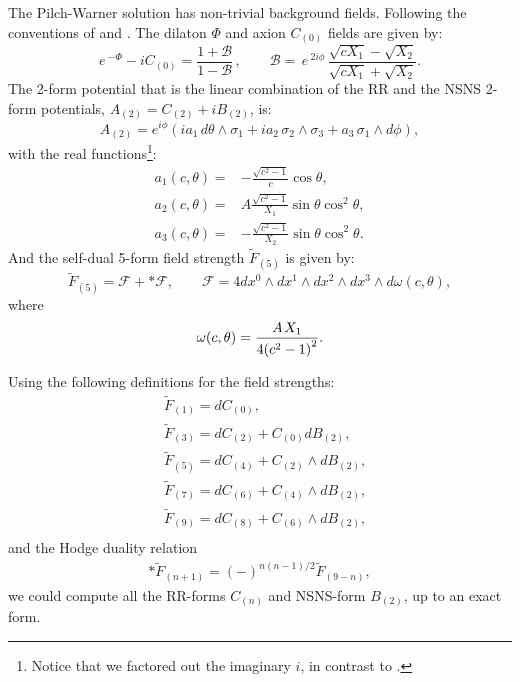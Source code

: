 The Pilch-Warner solution has non-trivial background fields. Following the conventions of \cite{Buchel:2000cn} and \cite{Pilch:2003jg}. The dilaton $\Phi$ and axion $C_{(0)}$ fields are given by:
\begin{equation}
 e\,^{-\Phi }-i C_{(0)} =\frac{1+\mathcal{B}}{1-\mathcal{B}}\,,
 \qquad
 \mathcal{B}=\,e\,^{2i\phi }\,\frac{\sqrt{cX_1}-\sqrt{X_2}}{\sqrt{cX_1}+\sqrt{X_2}}.
\end{equation}
The 2-form potential that is the linear combination of the RR and the NSNS 2-form potentials, $A_{(2)}=C_{(2)}+i B_{(2)}$, is:
\begin{equation}
 A_{(2)} = e^{i \phi}\left(i a_1 \, d\theta \wedge \sigma_1 + i a_2 \, \sigma_2 \wedge \sigma_3 + a_3\, \sigma_1 \wedge d\phi\right),
\end{equation}
with the real functions\footnote{Notice that we factored out the imaginary $i$, in contrast to \cite{Pilch:2003jg}.}:
\begin{align}
a_1(c,\theta) = & - \frac{\sqrt{c^2-1}}{c}\cos\theta,\nonumber\\
a_2(c,\theta) =  & A  \frac{\sqrt{c^2-1}}{X_1}\sin \theta \cos^2 \theta,\nonumber\\
a_3(c,\theta) =  &  -\frac{\sqrt{c^2-1}}{X_2}\sin \theta \cos^2 \theta.
\end{align}
And the self-dual 5-form field strength $\tilde{F}_{(5)}$ is given by:
\begin{equation}
\tilde{F}_{(5)} = \mathcal{F} + *\mathcal{F},
\qquad
\mathcal{F} = 4 d{x^0} \wedge d{x^1} \wedge d{x^2} \wedge d{x^3} \wedge d\omega(c,\theta),
\end{equation}
where 
\begin{equation}
\omega(c,\theta) = \frac{{A{\kern 1pt} {X_1}}}{{4{{\left( {{c^2} - 1} \right)}^2}}}.
\end{equation}

Using the following definitions for the field strengths:
\begin{align}\label{eq:defs2}
&\tilde F_{(1)} = d C_{(0)},\nonumber\\
&\tilde F_{(3)} = d C_{(2)} + C_{(0)} d B_{(2)},\nonumber\\
&\tilde F_{(5)} = d C_{(4)} + C_{(2)} \wedge d B_{(2)},\nonumber\\
&\tilde F_{(7)} = d C_{(6)} + C_{(4)} \wedge d B_{(2)},\nonumber\\
&\tilde F_{(9)} = d C_{(8)} + C_{(6)} \wedge d B_{(2)},\nonumber\\
\end{align}
and the Hodge duality relation 
\begin{align}\label{eq:dualityconstraint}
\ast \tilde F_{(n+1)} =(-)^{n(n-1)/2} \tilde F_{(9-n)},
\end{align}
we could compute all the RR-forms $C_{(n)}$ and NSNS-form $B_{(2)}$, up to an exact form. 

